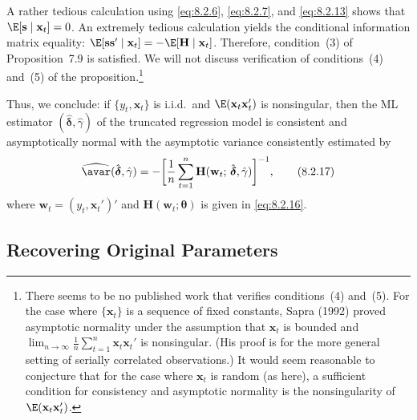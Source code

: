 A rather tedious calculation using \eqref{eq:8.2.6}, \eqref{eq:8.2.7}, and \eqref{eq:8.2.13} shows that
$\E[\mathbf{s} \mid \mathbf{x}_t] = 0$. An extremely tedious calculation yields the conditional information
matrix equality: $\E[\mathbf{s}\mathbf{s}' \mid \mathbf{x}_t] = -\E[\mathbf{H} \mid \mathbf{x}_t]$.
Therefore, condition~(3) of Proposition~7.9 is satisfied. We will not discuss verification of conditions~(4) and~(5) of
the proposition.\footnote{There seems to be no published work that verifies conditions~(4) and~(5). For the case where $\{\mathbf{x}_t\}$ is a
sequence of fixed constants, Sapra (1992) proved asymptotic normality under the assumption that $\mathbf{x}_t$ is bounded
and $\lim_{n\to\infty} \frac{1}{n}\sum_{t=1}^{n} \mathbf{x}_t\mathbf{x}_t'$ is nonsingular. (His proof is for the more general setting of serially correlated observations.) It would seem reasonable to conjecture that for the case where $\mathbf{x}_t$ is random (as here), a sufficient
condition for consistency and asymptotic normality is the nonsingularity of $\E(\mathbf{x}_t\mathbf{x}_t')$.}

Thus, we conclude: if $\{y_t, \mathbf{x}_t\}$ is i.i.d.\ and $\E(\mathbf{x}_t\mathbf{x}_t')$ is nonsingular, then the ML
estimator $(\hat{\boldsymbol{\delta}}, \hat{\gamma})$ of the truncated regression model is consistent and asymptotically
normal with the asymptotic variance consistently estimated by
\begin{equation}
  \widehat{\avar}(\hat{\boldsymbol{\delta}}, \hat{\gamma})
  = -\biggl[\frac{1}{n}\sum_{t=1}^{n}
    \mathbf{H}(\mathbf{w}_t;\, \hat{\boldsymbol{\delta}}, \hat{\gamma})\biggr]^{-1},
  \label{eq:8.2.17} \tag{8.2.17}
\end{equation}
where $\mathbf{w}_t = (y_t, \mathbf{x}_t')'$ and $\mathbf{H}(\mathbf{w}_t; \boldsymbol{\theta})$ is given in \eqref{eq:8.2.16}.

\subsection*{Recovering Original Parameters}

